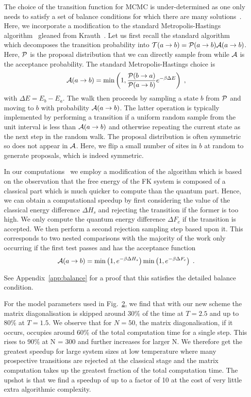 The choice of the transition function for {MCMC} is under-determined as one only needs to satisfy a set of balance conditions for which there are many solutions~\autocite{kellyReversibilityStochasticNetworks1981}. Here, we incorporate a modification to the standard Metropolis-Hastings algorithm~\autocite{hastingsMonteCarloSampling1970} gleaned from Krauth~\autocite{krauthIntroductionMonteCarlo1998}. Let us first recall the standard algorithm which decomposes the transition probability into \(\mathcal{T}(a \to b) = \mathcal{P}(a \to b)\mathcal{A}(a \to b)\). Here, \(\mathcal{P}\) is the proposal distribution that we can directly sample from while \(\mathcal{A}\) is the acceptance probability. The standard Metropolis-Hastings choice is \[\mathcal{A}(a \to b) = \min\left(1, \frac{\mathcal{P}(b\to a)}{\mathcal{P}(a\to b)} e^{-\beta \Delta E}\right)\;,\] with \(\Delta E = E_b - E_a\). The walk then proceeds by sampling a state \(b\) from \(\mathcal{P}\) and moving to \(b\) with probability \(\mathcal{A}(a \to b)\). The latter operation is typically implemented by performing a transition if a uniform random sample from the unit interval is less than \(\mathcal{A}(a \to b)\) and otherwise repeating the current state as the next step in the random walk. The proposal distribution is often symmetric so does not appear in \(\mathcal{A}\). Here, we flip a small number of sites in \(b\) at random to generate proposals, which is indeed symmetric.

In our computations~\autocite{hodsonMCMCFKModel2021} we employ a modification of the algorithm which is based on the observation that the free energy of the {FK} system is composed of a classical part which is much quicker to compute than the quantum part. Hence, we can obtain a computational speedup by first considering the value of the classical energy difference \(\Delta H_s\) and rejecting the transition if the former is too high. We only compute the quantum energy difference \(\Delta F_c\) if the transition is accepted. We then perform a second rejection sampling step based upon it. This corresponds to two nested comparisons with the majority of the work only occurring if the first test passes and has the acceptance function \[\mathcal{A}(a \to b) = \min\left(1, e^{-\beta \Delta H_s}\right)\min\left(1, e^{-\beta \Delta F_c}\right)\;.\]

See Appendix~\protect\hyperlink{app:balance}{{[}app:balance{]}} for a proof that this satisfies the detailed balance condition.

For the model parameters used in Fig.~\protect\hyperlink{fig:indiv_IPR}{2}, we find that with our new scheme the matrix diagonalisation is skipped around 30\% of the time at \(T = 2.5\) and up to 80\% at \(T = 1.5\). We observe that for \(N = 50\), the matrix diagonalisation, if it occurs, occupies around 60\% of the total computation time for a single step. This rises to 90\% at N = 300 and further increases for larger N. We therefore get the greatest speedup for large system sizes at low temperature where many prospective transitions are rejected at the classical stage and the matrix computation takes up the greatest fraction of the total computation time. The upshot is that we find a speedup of up to a factor of 10 at the cost of very little extra algorithmic complexity.


